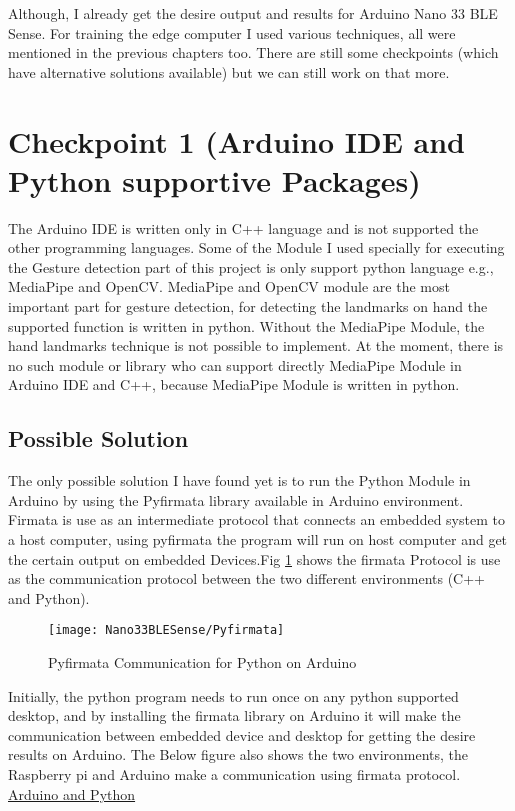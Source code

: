 Although, I already get the desire output and results for Arduino Nano 33 BLE Sense. For training the edge computer I used various techniques, all were mentioned in the previous chapters too. There are still some checkpoints (which have alternative solutions available) but we can still work on that more.
\section{Checkpoint 1 (Arduino IDE and Python supportive Packages)}
The Arduino IDE is written only in C++ language and is not supported the other programming languages. Some of the Module I used specially for executing the Gesture detection part of this project is only support python language e.g., MediaPipe and OpenCV. MediaPipe and OpenCV module are the most important part for gesture detection, for detecting the landmarks on hand the supported function is written in python. Without the MediaPipe Module, the hand landmarks technique is not possible to implement. At the moment, there is no such module or library who can support directly MediaPipe Module in Arduino IDE and C++, because MediaPipe Module is written in python. 
\subsection{Possible Solution}
The only possible solution I have found yet is to run the Python Module in Arduino by using the Pyfirmata library available in Arduino environment. Firmata is use as an intermediate protocol that connects an embedded system to a host computer, using pyfirmata the program will run on host computer and get the certain output on embedded Devices.Fig \ref{Python and Arduino} shows the firmata Protocol is use as the communication protocol between the two different environments (C++ and Python). 
\begin{figure}[h]
	\centering
	\texttt{[image: Nano33BLESense/Pyfirmata]}
	\caption{Pyfirmata Communication for Python on Arduino}
	\label{Python and Arduino}
\end{figure}
Initially, the python program needs to run once on any python supported desktop, and by installing the firmata library on Arduino it will make the communication between embedded device and desktop for getting the desire results on Arduino. The Below figure also shows the two environments, the Raspberry pi and Arduino make a communication using firmata protocol. \href{https://roboticsbackend.com/control-arduino-with-python-and-pyfirmata-from-raspberry-pi/}{Arduino and Python}
